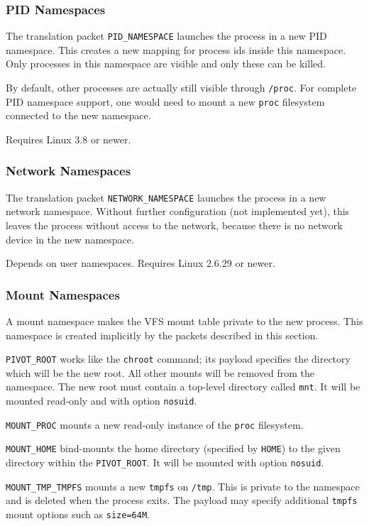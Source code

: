 \documentclass[a4paper,12pt]{article}
\begin{document}
\subsubsection{PID Namespaces}

The translation packet \verb|PID_NAMESPACE| launches the process in a
new PID namespace.  This creates a new mapping for process ids inside
this namespace.  Only processes in this namespace are visible and only
these can be killed.

By default, other processes are actually still visible through
\texttt{/proc}.  For complete PID namespace support, one would need to
mount a new \texttt{proc} filesystem connected to the new namespace.

Requires Linux 3.8 or newer.

\subsubsection{Network Namespaces}

The translation packet \verb|NETWORK_NAMESPACE| launches the process
in a new network namespace.  Without further configuration (not
implemented yet), this leaves the process without access to the
network, because there is no network device in the new namespace.

Depends on user namespaces.  Requires Linux 2.6.29 or newer.

\subsubsection{Mount Namespaces}

A mount namespace makes the VFS mount table private to the new
process.  This namespace is created implicitly by the packets
described in this section.

\verb|PIVOT_ROOT| works like the \texttt{chroot} command; its
payload specifies the directory which will be the new root.  All other
mounts will be removed from the namespace.  The new root must contain
a top-level directory called \texttt{mnt}.  It will be mounted
read-only and with option \texttt{nosuid}.

\verb|MOUNT_PROC| mounts a new read-only instance of the \texttt{proc}
filesystem.

\verb|MOUNT_HOME| bind-mounts the home directory (specified by
\verb|HOME|) to the given directory within the \verb|PIVOT_ROOT|.  It
will be mounted with option \texttt{nosuid}.

\verb|MOUNT_TMP_TMPFS| mounts a new \texttt{tmpfs} on \texttt{/tmp}.
This is private to the namespace and is deleted when the process
exits.  The payload may specify additional \texttt{tmpfs} mount
options such as \texttt{size=64M}.
\end{document}
